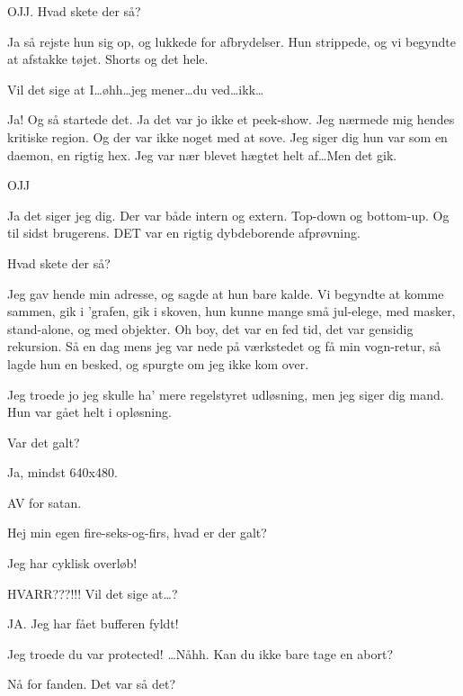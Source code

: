 \documentclass[a4paper,11pt]{article}
\begin{document}
\begin{sketch}
     OJJ. Hvad skete der så?

     Ja så rejste hun sig op, og lukkede for afbrydelser. Hun strippede, og vi begyndte at afstakke tøjet. Shorts og det hele.

     Vil det sige at I\ldots øhh\ldots jeg mener\ldots du ved\ldots ikk\ldots

     Ja! Og så startede det. Ja det var jo ikke et peek-show. Jeg nærmede mig hendes kritiske region. Og der var ikke noget med at sove.
              Jeg siger dig hun var som en daemon, en rigtig hex. Jeg var nær blevet hægtet helt af\ldots Men det gik.
    
     OJJ

     Ja det siger jeg dig. Der var både intern og extern. Top-down og bottom-up. Og til sidst brugerens. DET var en rigtig dybdeborende afprøvning.

     Hvad skete der så?

     Jeg gav hende min adresse, og sagde at hun bare kalde. Vi begyndte at komme sammen, gik i 'grafen, gik i skoven, hun kunne mange små
              jul-elege, med masker, stand-alone, og med objekter. Oh boy, det var en fed tid, det var gensidig rekursion.
              Så en dag mens jeg var nede på værkstedet og få min vogn-retur, så lagde hun en besked, og spurgte om jeg ikke kom over.


     Jeg troede jo jeg skulle ha' mere regelstyret udløsning, men jeg siger dig mand. Hun var gået helt i opløsning.

     Var det galt?

     Ja, mindst 640x480.

     AV for satan.

     Hej min egen fire-seks-og-firs, hvad er der galt?

     Jeg har cyklisk overløb!

     HVARR???!!! Vil det sige at\ldots?

     JA. Jeg har fået bufferen fyldt!

     Jeg troede du var protected! \ldots Nåhh. Kan du ikke bare tage en abort?


     Nå for fanden. Det var så det?


\end{sketch}
\end{document}
